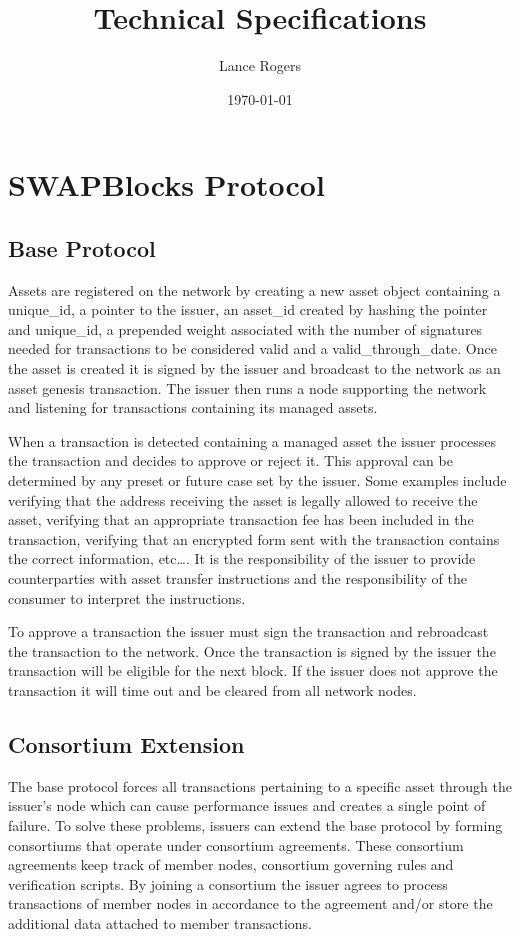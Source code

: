 \documentclass[12pt]{article}
\title{Technical Specifications }
\author{Lance Rogers}
\date{\today}
\begin{document}
\maketitle


\section{SWAPBlocks Protocol}
\subsection{Base Protocol}
Assets are registered on the network by creating a new asset object containing 
a unique\_id, a pointer to the issuer, an asset\_id created by hashing the pointer 
and unique\_id, a prepended weight associated with the number of signatures needed 
for transactions to be considered valid and a valid\_through\_date.  Once the asset 
is created it is signed by the issuer and broadcast to the network as an asset 
genesis transaction. The issuer then runs a node supporting the network and listening 
for transactions containing its managed assets.

When a transaction is detected containing a managed asset the issuer processes the 
transaction and decides to approve or reject it.  This approval can be 
determined by any preset or future case set by the issuer.  Some examples include 
verifying that the address receiving the asset is legally allowed to receive the asset, 
verifying that an appropriate transaction fee has been included in the transaction, 
verifying that an encrypted form sent with the transaction contains the correct 
information, etc….  It is the responsibility of the issuer to provide counterparties with 
asset transfer instructions and the responsibility of the consumer to interpret
the instructions.

To approve a transaction the issuer must sign the transaction and rebroadcast 
the transaction to the network. Once the transaction is signed by the issuer
the transaction will be eligible for the next block.  
If the issuer does not approve the transaction it will
time out and be cleared from all network nodes.

\subsection{Consortium Extension}

The base protocol forces all transactions pertaining to a specific asset through 
the issuer's node which can cause performance issues and creates a single point 
of failure.  To solve these problems, issuers can extend the base protocol by 
forming consortiums that operate under consortium agreements.  These consortium 
agreements keep track of member nodes, consortium governing rules and 
verification scripts.  By joining a consortium the issuer agrees to process 
transactions of member nodes in accordance to the agreement and/or store 
the additional data attached to member transactions.
\end{document}
